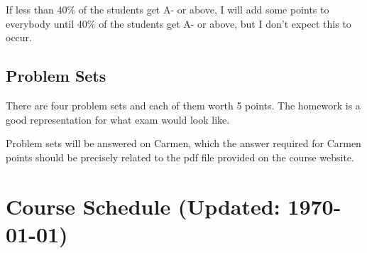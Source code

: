 \documentclass[12pt]{article}
\begin{document}
If less than $40\%$ of the students get A- or above, I will add some points to everybody until $40\%$ of the students get A- or above, but I don’t expect this to occur.

\subsection*{Problem Sets}
\label{sub:Problem_Sets}

There are four problem sets and each of them worth 5 points.
The homework is a good representation for what exam would look like.

Problem sets will be answered on Carmen, which the answer required for Carmen points should be precisely related to the pdf file provided on the course website.







\newpage

\section*{Course Schedule (Updated: \today)}
\end{document}
